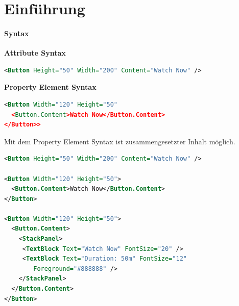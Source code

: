 \section{Einführung}
\paragraph{Syntax}
\textbf{Attribute Syntax}
\begin{lstlisting}[language=xml]
<Button Height="50" Width="200" Content="Watch Now" />
\end{lstlisting}
\textbf{Property Element Syntax}
\begin{lstlisting}[language=xml]
<Button Width="120" Height="50"
  <Button.Content>Watch Now</Button.Content>
</Button>>
\end{lstlisting}
Mit dem Property Element Syntax ist zusammengesetzter Inhalt möglich. 
\begin{lstlisting}[language=xml]
<Button Height="50" Width="200" Content="Watch Now" />

<Button Width="120" Height="50">
  <Button.Content>Watch Now</Button.Content>
</Button>

<Button Width="120" Height="50">
  <Button.Content>
    <StackPanel>
     <TextBlock Text="Watch Now" FontSize="20" />
     <TextBlock Text="Duration: 50m" FontSize="12" 
        Foreground="#888888" />
    </StackPanel>
  </Button.Content>
</Button> 
\end{lstlisting}

